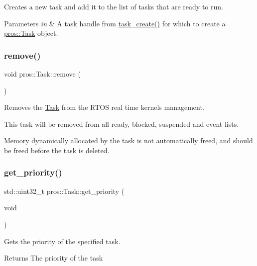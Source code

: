 Creates a new task and add it to the list of tasks that are ready to run. 


\begin{DoxyParams}{Parameters}
{\em in} & A task handle from \hyperlink{rtos_8h_a2e3ed8f26b8c1edcff493bc583f0a76a}{task\+\_\+create()} for which to create a \hyperlink{classpros_1_1Task}{pros\+::\+Task} object. \\
\hline
\end{DoxyParams}
\mbox{\label{classpros_1_1Task_a45269807dfc87bb1d5e9580346793e9d}} 
\subsubsection{\texorpdfstring{remove()}{remove()}}
{\footnotesize\ttfamily void pros\+::\+Task\+::remove (\begin{DoxyParamCaption}{ }\end{DoxyParamCaption})}



Removes the \hyperlink{classpros_1_1Task}{Task} from the R\+T\+OS real time kernel\textquotesingle{}s management. 

This task will be removed from all ready, blocked, suspended and event lists.

Memory dynamically allocated by the task is not automatically freed, and should be freed before the task is deleted. \mbox{\label{classpros_1_1Task_a97e11478bd99181a664ed6e975fdb248}} 
\subsubsection{\texorpdfstring{get\+\_\+priority()}{get\_priority()}}
{\footnotesize\ttfamily std\+::uint32\+\_\+t pros\+::\+Task\+::get\+\_\+priority (\begin{DoxyParamCaption}\item[{void}]{ }\end{DoxyParamCaption})}



Gets the priority of the specified task. 

\begin{DoxyReturn}{Returns}
The priority of the task 
\end{DoxyReturn}
\mbox{\label{classpros_1_1Task_a205a9937d34311ba10f540bc58d0b0b9}} 
